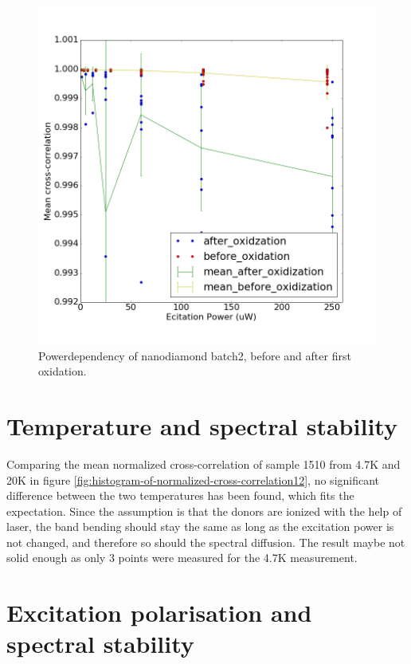 \begin{figure}[h]
\centering
\includegraphics[width=0.7\linewidth]{Figures/pic/powerdependencybeforeafteroxidation}
\caption{Powerdependency of nanodiamond batch2, before and after first oxidation.}
\label{fig:powerdependencybeforeafteroxidation}
\end{figure}

\section{Temperature and spectral stability}
Comparing the mean normalized cross-correlation of sample 1510 from 4.7K and 20K in figure \ref{fig:histogram-of-normalized-cross-correlation12}, no significant difference between the two temperatures has been found, which fits the expectation. Since the assumption is that the donors are ionized with the help of laser, the band bending should stay the same as long as the excitation power is not changed, and therefore so should the spectral diffusion. The result maybe not solid enough as only 3 points were measured for the 4.7K measurement. 

\section{Excitation polarisation and spectral stability}


